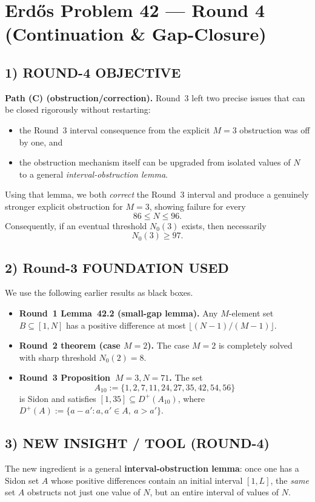 \section{Erd\H{o}s Problem 42 --- Round 4 (Continuation \& Gap-Closure)}

\subsection{1) ROUND-4 OBJECTIVE}
\textbf{Path (C) (obstruction/correction).}
Round~3 left two precise issues that can be closed rigorously without restarting:

\begin{itemize}
  \item the Round~3 interval consequence from the explicit \(M=3\) obstruction was off by one, and
  \item the obstruction mechanism itself can be upgraded from isolated values of \(N\) to a general \emph{interval-obstruction lemma}.
\end{itemize}

Using that lemma, we both \emph{correct} the Round~3 interval and produce a genuinely stronger explicit obstruction for \(M=3\), showing failure for every
\[
86\le N\le 96.
\]
Consequently, if an eventual threshold \(N_0(3)\) exists, then necessarily
\[
N_0(3)\ge 97.
\]

\subsection{2) Round-3 FOUNDATION USED}
We use the following earlier results as black boxes.

\begin{itemize}
  \item \textbf{Round~1 Lemma~42.2 (small-gap lemma).} Any \(M\)-element set \(B\subseteq[1,N]\) has a positive difference at most \(\lfloor (N-1)/(M-1)\rfloor\).
  \item \textbf{Round~2 theorem (case \(M=2\)).} The case \(M=2\) is completely solved with sharp threshold \(N_0(2)=8\).
  \item \textbf{Round~3 Proposition~\(M=3, N=71\).} The set
  \[
  A_{10}:=\{1,2,7,11,24,27,35,42,54,56\}
  \]
  is Sidon and satisfies \([1,35]\subseteq D^+(A_{10})\), where \(D^+(A):=\{a-a':a,a'\in A,\ a>a'\}\).
\end{itemize}

\subsection{3) NEW INSIGHT / TOOL (ROUND-4)}
The new ingredient is a general \textbf{interval-obstruction lemma}: once one has a Sidon set \(A\) whose positive differences contain an initial interval \([1,L]\), the \emph{same} set \(A\) obstructs not just one value of \(N\), but an entire interval of values of \(N\).

